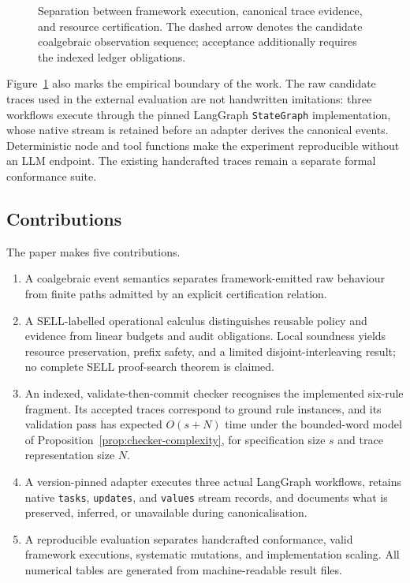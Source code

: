 \documentclass[a4paper,fleqn]{cas-sc}
\begin{document}
\begin{figure}[tbp]
\centering

\caption{Separation between framework execution, canonical trace evidence, and
resource certification. The dashed arrow denotes the candidate coalgebraic
observation sequence;
acceptance additionally requires the indexed ledger obligations.}
\label{fig:certification-architecture}
\end{figure}

Figure~\ref{fig:certification-architecture} also marks the empirical boundary
of the work. The raw candidate traces used in the external evaluation are not
handwritten imitations: three workflows execute through the pinned LangGraph
\texttt{StateGraph} implementation, whose native stream is retained before an
adapter derives the canonical events. Deterministic node and tool functions
make the experiment reproducible without an LLM endpoint. The existing
handcrafted traces remain a separate formal conformance suite.

\subsection{Contributions}

The paper makes five contributions.

\begin{enumerate}
  \item A coalgebraic event semantics separates framework-emitted raw behaviour
  from finite paths admitted by an explicit certification relation.
  \item A SELL-labelled operational calculus distinguishes reusable policy and
  evidence from linear budgets and audit obligations. Local soundness yields
  resource preservation, prefix safety, and a limited disjoint-interleaving
  result; no complete SELL proof-search theorem is claimed.
  \item An indexed, validate-then-commit checker recognises the implemented
  six-rule fragment. Its accepted traces correspond to ground rule instances,
  and its validation pass has expected \(O(s+N)\) time under the bounded-word
  model of Proposition~\ref{prop:checker-complexity}, for specification size
  \(s\) and trace representation size \(N\).
  \item A version-pinned adapter executes three actual LangGraph workflows,
  retains native \texttt{tasks}, \texttt{updates}, and \texttt{values} stream
  records, and documents what is preserved, inferred, or unavailable during
  canonicalisation.
  \item A reproducible evaluation separates handcrafted conformance, valid
  framework executions, systematic mutations, and implementation scaling. All
  numerical tables are generated from machine-readable result files.
\end{enumerate}
\end{document}
